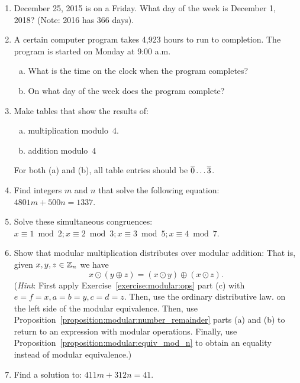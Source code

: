 \begin{enumerate}

\item
December 25, 2015 is on a Friday.  What day of the week is December 1, 2018?  (Note: 2016 has 366 days).

\item
A certain computer program takes 4,923 hours to run to completion. The program is started on Monday at 9:00 a.m.
\begin{enumerate}[(a)]
\item
What is the time on the clock when the program completes?
\item
On what day of the week does the program complete?
\end{enumerate}



\item
Make tables that show the results of:
\begin{enumerate}[(a)]
\item \label{Mod3TablesEx-multiplication}
multiplication modulo~$4$.
\item \label{Mod3TablesEx-subtraction}
addition modulo~$4$
\end{enumerate}
For both (a) and (b), all table entries should be  $\overline{0} \ldots \overline{3}$.



\item
Find integers $m$ and $n$ that solve the following equation: $4801m + 500n = 1337$.

\item
Solve these simultaneous congruences: $x \equiv 1 \bmod{2}; x \equiv 2 \bmod{3}; x \equiv 3 \bmod{5}; x\equiv4 \bmod{7}$.


\item
Show that  modular multiplication distributes over modular addition: That is, given $x,y,z \in \mathbb{Z}_n$ we have
\[
x \odot (y \oplus z) = (x \odot y) \oplus  (x \odot z).
\]
(\emph{Hint}:  First apply Exercise~\ref{exercise:modular:ops} part (c)  with $e=f=x, a=b=y, c=d=z$. Then, use the ordinary distributive law. on the left side of the modular equivalence.  Then, use  Proposition~\ref{proposition:modular:number_remainder} parts (a) and (b) to return to an expression with modular operations.  Finally, use Proposition~\ref{proposition:modular:equiv_mod_n} to obtain an equality instead of modular equivalence.)

\item
 Find a solution to:  $411m + 312n = 41 $.


\end{enumerate}
